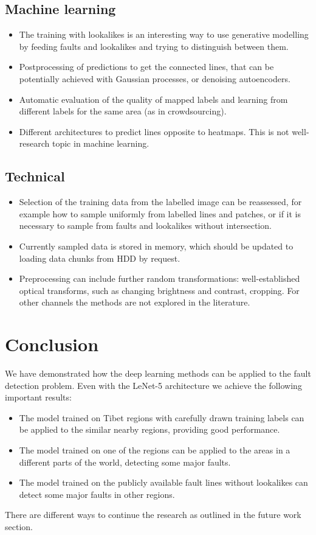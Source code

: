 \documentclass[11pt,a4paper]{article}
\begin{document}
\subsection{Machine learning}
    \begin{itemize}
        \item The training with lookalikes is an interesting way to use generative modelling by feeding faults and lookalikes and trying to
            distinguish between them.
        \item Postprocessing of predictions to get the connected lines, that can be potentially achieved with Gaussian processes,
            or denoising autoencoders.
        \item Automatic evaluation of the quality of mapped labels and learning from different labels for the same area (as in
            crowdsourcing).
        \item Different architectures to predict lines opposite to heatmaps. This is not well-research topic in machine learning.
    \end{itemize}
\subsection{Technical}
    \begin{itemize}
        \item Selection of the training data from the labelled image can be reassessed, for example how to sample
            uniformly from labelled lines and patches, or if it is necessary to sample from faults and lookalikes without
            intersection.
        \item Currently sampled data is stored in memory, which should be updated to loading data chunks from HDD by request.
        \item Preprocessing can include further random transformations: well-established optical transforms, such as changing
            brightness and contrast, cropping. For other channels the methods are not explored in the literature.
    \end{itemize}

\section{Conclusion}
We have demonstrated how the deep learning methods can be applied to the fault detection problem. Even with the LeNet-5
architecture we achieve the following important results:
\begin{itemize}
    \item The model trained on Tibet regions with carefully drawn training labels can be applied to the similar
    nearby regions, providing good performance.
    \item The model trained on one of the regions can be applied to the areas in a different parts of the world,
    detecting some major faults.
    \item The model trained on the publicly available fault lines without lookalikes can detect some major faults in other regions.
\end{itemize}
There are different ways to continue the research as outlined in the future work section.
\end{document}
